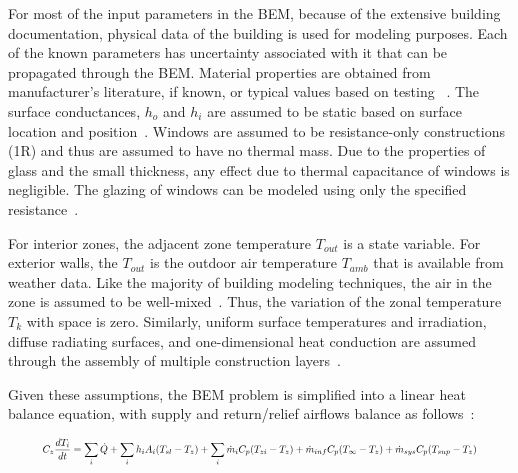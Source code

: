 For most of the input parameters in the BEM, because of the extensive building documentation, physical data of the building is used for modeling purposes. Each of the known parameters has uncertainty associated with it that can be propagated through the BEM. Material properties are obtained from manufacturer’s literature, if known, or typical values based on testing ~\citep{american20132013}. The surface conductances, $h_{o}$ and $h_{i}$ are assumed to be static based on surface location and position~\citep{kircher2015lumped}.  Windows are assumed to be resistance-only constructions (1R) and thus are assumed to have no thermal mass. Due to the properties of glass and the small thickness, any effect due to thermal capacitance of windows is negligible. The glazing of windows can be modeled using only the specified resistance~\citep{kircher2015lumped}.

For interior zones, the adjacent zone temperature $T_{out}$ is a state variable. For exterior walls, the $T_{out}$ is the outdoor air temperature $T_{amb}$ that is available from weather data. Like the majority of building modeling techniques, the air in the zone is assumed to be well-mixed~\citep{fisher1997convective}. Thus, the variation of the zonal temperature $T_k$ with space is zero. Similarly, uniform surface temperatures and irradiation, diffuse radiating surfaces, and one-dimensional heat conduction are assumed through the assembly of multiple construction layers~\citep{american20132013}.

Given these assumptions, the BEM problem is simplified into a linear heat balance equation, with supply and return/relief airflows balance as follows~\citep{doe2016energyplus}:

\begin{equation}
\label{heat_balance}
\resizebox{0.9\textwidth}{!}{$
\displaystyle C_z \frac{dT_i}{dt} = \sum_{i} \dot{Q} + \sum_i h_i A_i (T_{sl} - T_z) + \sum_i \dot{m}_i C_p (T_{zi} - T_z) + \dot{m}_{inf}C_p(T_{\infty} - T_z) + \dot{m}_{sys}C_p (T_{sup} - T_z)
$}
\end{equation}

